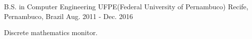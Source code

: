 


\begin{cventries}


\cventry
{B.S. in Computer Engineering} %
{UFPE(Federal University of Pernambuco)} %
{Recife, Pernambuco, Brazil} %
{Aug. 2011 - Dec. 2016} %
{ %
\begin{cvitems}
\item {Discrete mathematics monitor.}
\end{cvitems}
}


\end{cventries}